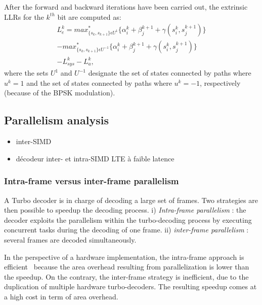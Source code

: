 After the forward and backward iterations have been carried out, the extrinsic
LLRs for the $k^{th}$ bit are computed as:
\begin{equation}
  \label{eq:turbo_ext}
  \begin{aligned}
  L_e^k = max_{\{s_k, s_{k+1}\}\epsilon U^1}^*\{ \alpha_i^k + \beta_j^{k+1} +
  \gamma(s_i^k, s_j^{k+1}) \} \\
  - max_{\{s_k, s_{k+1}\}\epsilon U^{-1}}^*\{ \alpha_i^k + \beta_j^{k+1} +
  \gamma(s_i^k, s_j^{k+1}) \} \\
  - L_{sys}^k - L_a^k,
  \end{aligned}
\end{equation}
where the sets $U^1$ and $U^{-1}$ designate the set of states connected by paths
where $u^k=1$ and the set of states connected by paths where $u^k=-1$,
respectively (because of the BPSK modulation).

\subsection{Parallelism analysis}
\label{sec:turbo_parallelism}

\begin{itemize}
  \item inter-SIMD
  \item décodeur inter- et intra-SIMD LTE à faible latence
\end{itemize}

\subsubsection{Intra-frame versus inter-frame parallelism}

A Turbo decoder is in charge of decoding a large set of frames. Two strategies
are then possible to speedup the decoding process. i)
\textit{Intra-frame parallelism} : the decoder exploits the parallelism within
the turbo-decoding process by executing concurrent tasks during
the decoding of one frame. ii) \textit{inter-frame parallelism} : several frames
are decoded simultaneously.

In the perspective of a hardware implementation, the intra-frame approach is
efficient~\cite{Muller2009} because the area overhead resulting from
parallelization is lower than the speedup. On the contrary, the inter-frame
strategy is inefficient, due to the duplication of multiple hardware
turbo-decoders. The resulting speedup comes at a high cost in term of area
overhead.

